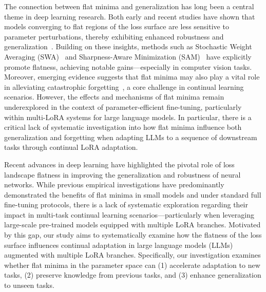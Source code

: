 \documentclass[letterpaper]{article} %
\begin{document}
The connection between flat minima and generalization has long been a central theme in deep learning research. Both early and recent studies have shown that models converging to flat regions of the loss surface are less sensitive to parameter perturbations, thereby exhibiting enhanced robustness and generalization~. Building on these insights, methods such as Stochastic Weight Averaging (SWA)~ and Sharpness-Aware Minimization (SAM)~ have explicitly promote flatness, achieving notable gains—especially in computer vision tasks. Moreover, emerging evidence suggests that flat minima may also play a vital role in alleviating catastrophic forgetting~\cite{mirzadehUnderstandingRoleTraining2020,JMLRAnEmpiricalInvestigatio}, a core challenge in continual learning scenarios. However, the effects and mechanisms of flat minima remain underexplored in the context of parameter-efficient fine-tuning, particularly within multi-LoRA systems for large language models. In particular, there is a critical lack of systematic investigation into how flat minima influence both generalization and forgetting when adapting LLMs to a sequence of downstream tasks through continual LoRA adaptation.



Recent advances in deep learning have highlighted the pivotal role of loss landscape flatness in improving the generalization and robustness of neural networks. 
While previous empirical investigations have predominantly demonstrated the benefits of flat minima in small models and under standard full fine-tuning protocols, there is a lack of systematic exploration regarding their impact in multi-task continual learning scenarios—particularly when leveraging large-scale pre-trained models equipped with multiple LoRA branches. 
Motivated by this gap, our study aims to systematically examine how the flatness of the loss surface influences continual adaptation in large language models (LLMs) augmented with multiple LoRA branches. Specifically,  our investigation examines whether flat minima in the parameter space can (1) accelerate adaptation to new tasks, (2) preserve knowledge from previous tasks, and (3) enhance generalization to unseen tasks.


\end{document}
